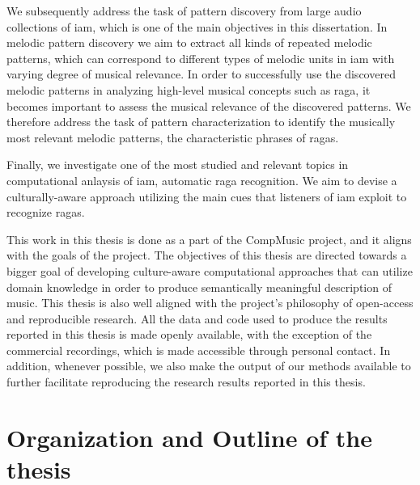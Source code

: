 We subsequently address the task of pattern discovery from large audio collections of \gls{iam}, which is one of the main objectives in this dissertation. In melodic pattern discovery we aim to extract all kinds of repeated melodic patterns, which can correspond to different types of melodic units in \gls{iam} with varying degree of musical relevance. In order to successfully use the discovered melodic patterns in analyzing high-level musical concepts such as \gls{raga}, it becomes important to assess the musical relevance of the discovered patterns. We therefore address the task of pattern characterization to identify the musically most relevant melodic patterns, the characteristic phrases of \glspl{raga}.

Finally, we investigate one of the most studied and relevant topics in computational anlaysis of \gls{iam}, automatic \gls{raga} recognition. We aim to devise a culturally-aware approach utilizing the main cues that listeners of \gls{iam} exploit to recognize \glspl{raga}. 

This work in this thesis is done as a part of the CompMusic project, and it aligns with the goals of the project. The objectives of this thesis are directed towards a bigger goal of developing culture-aware computational approaches that can utilize domain knowledge in order to produce semantically meaningful description of music. This thesis is also well aligned with the project's philosophy of open-access and reproducible research. All the data and code used to produce the results reported in this thesis is made openly available, with the exception of the commercial recordings, which is made accessible through personal contact. In addition, whenever possible, we also make the output of our methods available to further facilitate reproducing the research results reported in this thesis.




\section{Organization and Outline of the thesis}
\label{sec:intro_organization}


